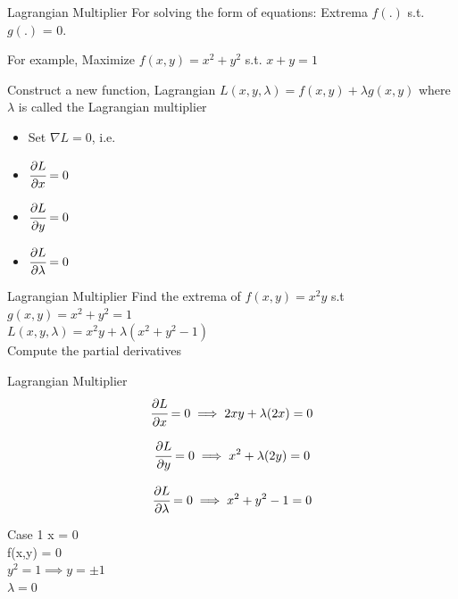 \documentclass{beamer}
\begin{document}
{
	
}



\begin{frame}{Lagrangian Multiplier}
For solving the form of equations: Extrema $f(.)$ s.t. $g(.)$ = 0.

\pause For example, Maximize $f(x, y) = x^2 + y^2$ s.t. $x + y = 1$

\pause Construct a new function, Lagrangian $L(x,y,\lambda) = f(x, y) + \lambda g(x, y)$ where $\lambda$ is called the Lagrangian multiplier 
\pause \begin{itemize}[<+->]
\item Set $\nabla L = 0$, i.e.
\item $\cfrac{\partial L}{\partial x} = 0$
\item $\cfrac{\partial L}{\partial y} = 0$
\item $\cfrac{\partial L}{\partial \lambda} = 0$
\end{itemize}

\end{frame}


\begin{frame}{Lagrangian Multiplier}
Find the extrema of $f(x,y) =x^{2}y$ s.t $g(x,y)=x^{2}+y^{2} = 1$ \\
\vspace{1em}
\pause $L (x, y, \lambda) = x^{2}y + \lambda (x^{2} + y^{2} - 1)$\\
\vspace{1em}
\pause Compute the partial derivatives
\end{frame}

\begin{frame}{Lagrangian Multiplier}
\begin{equation}
\cfrac{\partial L}{\partial x} = 0 \implies 2xy + \lambda(2x) = 0
\end{equation}

\begin{equation}
\cfrac{\partial L}{\partial y} = 0 \implies x^{2} + \lambda(2y) = 0
\end{equation}

\begin{equation}
\cfrac{\partial L}{\partial \lambda} = 0 \implies x^{2} + y^{2} - 1 = 0
\end{equation}
\end{frame}

\begin{frame}{Case 1}
x = 0\\
\vspace{1em}
f(x,y) = 0\\
\vspace{1em}
$y^{2} = 1 \implies y= \pm 1$\\
\vspace{1em}
$\lambda = 0$
\end{frame}
\end{document}
